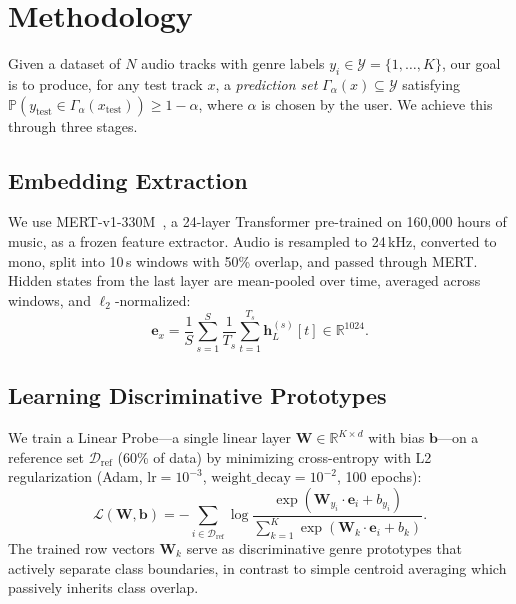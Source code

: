
\section{Methodology}
\label{sec:methodology}

Given a dataset of $N$ audio tracks with genre labels $y_i \in \mathcal{Y} =
\{1, \dots, K\}$, our goal is to produce, for any test track $x$, a
\emph{prediction set} $\Gamma_{\alpha}(x) \subseteq \mathcal{Y}$ satisfying
$\mathbb{P}(y_{\text{test}} \in \Gamma_{\alpha}(x_{\text{test}})) \geq
1 - \alpha$, where $\alpha$ is chosen by the user. We achieve this through three
stages.

\subsection{Embedding Extraction}

We use MERT-v1-330M~\cite{li2023mert}, a 24-layer Transformer pre-trained on
160,000 hours of music, as a frozen feature extractor. Audio is resampled to
24\,kHz, converted to mono, split into 10\,s windows with 50\% overlap, and
passed through MERT. Hidden states from the last layer are mean-pooled over
time, averaged across windows, and $\ell_2$-normalized:
\begin{equation}
  \mathbf{e}_x = \frac{1}{S} \sum_{s=1}^{S}
  \frac{1}{T_s} \sum_{t=1}^{T_s} \mathbf{h}_L^{(s)}[t] \in \mathbb{R}^{1024}.
  \label{eq:embedding}
\end{equation}

\subsection{Learning Discriminative Prototypes}

We train a Linear Probe---a single linear layer $\mathbf{W} \in \mathbb{R}^{K
\times d}$ with bias $\mathbf{b}$---on a reference set
$\mathcal{D}_{\text{ref}}$ (60\% of data) by minimizing cross-entropy with L2
regularization (Adam, $\text{lr}=10^{-3}$, $\text{weight\_decay}=10^{-2}$, 100
epochs):
\begin{equation}
  \mathcal{L}(\mathbf{W}, \mathbf{b}) = -\sum_{i \in \mathcal{D}_{\text{ref}}}
  \log \frac{\exp(\mathbf{W}_{y_i} \cdot \mathbf{e}_i + b_{y_i})}
  {\sum_{k=1}^{K} \exp(\mathbf{W}_k \cdot \mathbf{e}_i + b_k)}.
  \label{eq:lp_loss}
\end{equation}
The trained row vectors $\mathbf{W}_k$ serve as discriminative genre prototypes
that actively separate class boundaries, in contrast to simple centroid
averaging which passively inherits class overlap.

